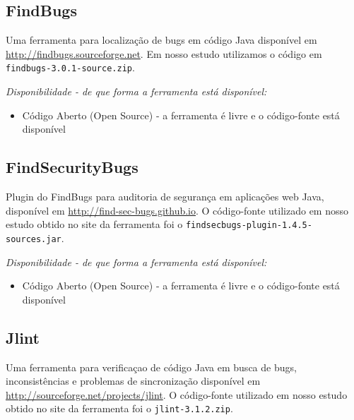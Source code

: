 \subsection{FindBugs}

Uma ferramenta para localização de bugs em código Java disponível em
\url{http://findbugs.sourceforge.net}. Em nosso estudo utilizamos o código em
\texttt{findbugs-3.0.1-source.zip}.

\begin{description}

  \item {\it Disponibilidade - de que forma a ferramenta está disponível:}
    \begin{itemize}
      \item Código Aberto (Open Source) - a ferramenta é livre e o código-fonte está disponível
    \end{itemize}

\end{description}

\subsection{FindSecurityBugs}

Plugin do FindBugs para auditoria de segurança em aplicações web Java,
disponível em \url{http://find-sec-bugs.github.io}.  O código-fonte utilizado
em nosso estudo obtido no site da ferramenta foi o
\texttt{findsecbugs-plugin-1.4.5-sources.jar}.

\begin{description}

  \item {\it Disponibilidade - de que forma a ferramenta está disponível:}
    \begin{itemize}
      \item Código Aberto (Open Source) - a ferramenta é livre e o código-fonte está disponível
    \end{itemize}

\end{description}

\subsection{Jlint}

Uma ferramenta para verificaçao de código Java em busca de bugs,
inconsistências e problemas de sincronização disponível em
\url{http://sourceforge.net/projects/jlint}.  O código-fonte utilizado em
nosso estudo obtido no site da ferramenta foi o \texttt{jlint-3.1.2.zip}.

